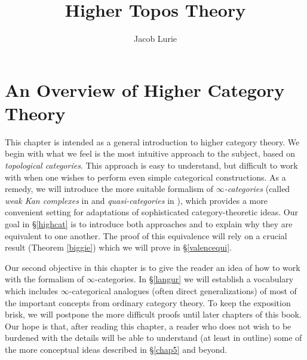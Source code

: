 \documentclass{report}[10pt, final]
\theoremstyle{definition}
\begin{document}
\begin{intro}

\title{Higher Topos Theory}
\author{Jacob Lurie}



\end{intro}
\begin{TOC}
\tableofcontents
\end{TOC}

\chapter{An Overview of Higher Category Theory}\label{chap1}
\begin{1 Overview of Higher Category Theory}
\setcounter{theorem}{0}
\setcounter{subsection}{0}
This chapter is intended as a general introduction to higher category theory. We begin with what we feel is the most intuitive approach to the subject, based on {\it topological categories}. This approach is easy to understand, but difficult to work with when one wishes to perform even simple categorical constructions. As a remedy, we will introduce the more suitable formalism of {\it $\infty$-categories} (called
{\it weak Kan complexes} in \cite{quasicat} and {\it quasi-categories} in \cite{joyalpub}), which
provides a more convenient setting for adaptations of sophisticated category-theoretic ideas.
Our goal in \S \ref{highcat} is to introduce both approaches and to explain why they are equivalent to one another. The proof of this equivalence will rely on a crucial result (Theorem \ref{biggie}) which we will prove in \S \ref{valencequi}.

Our second objective in this chapter is to give the reader an idea of how to work with the formalism of $\infty$-categories. In \S \ref{langur} we will establish a vocabulary which includes $\infty$-categorical analogues (often direct generalizations) of most of the important concepts from ordinary category theory. To keep the exposition brisk, we will postpone the more difficult proofs until later chapters of this book. Our hope is that, after reading this chapter, a reader who does not wish to be burdened with the details will be able to understand (at least in outline) some of the more conceptual ideas described in \S \ref{chap5} and beyond.

\setcounter{section}{0}
\begin{1.1 Formalism}

\end{1.1 Formalism}
\setcounter{section}{1}
\begin{1.2 language}

\end{1.2 language}
\end{1 Overview of Higher Category Theory}
\end{document}

